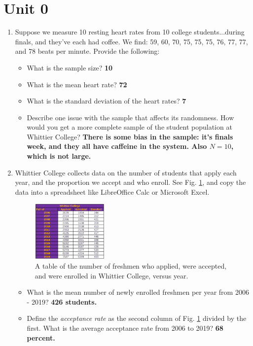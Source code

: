 \documentclass{article}
\begin{document}
\clearpage

\section{Unit 0}

\begin{enumerate}
\item Suppose we measure 10 resting heart rates from 10 college students...during finals, and they've each had coffee.  We find: 59, 60, 70, 75, 75, 75, 76, 77, 77, and 78 beats per minute.  Provide the following:
\begin{itemize}
\item What is the sample size? \textbf{10}
\item What is the mean heart rate? \textbf{72}
\item What is the standard deviation of the heart rates? \textbf{7}
\item Describe one issue with the sample that affects its randomness.  How would you get a more complete sample of the student population at Whittier College? \textbf{There is some bias in the sample: it's finals week, and they all have caffeine in the system.  Also $N = 10$, which is not large.}
\end{itemize}
\vspace{1cm}
\item Whittier College collects data on the number of students that apply each year, and the proportion we accept and who enroll.  See Fig. \ref{fig:admit}, and copy the data into a spreadsheet like LibreOffice Calc or Microsoft Excel.
\begin{figure}[ht]
\centering
\includegraphics[width=0.35\textwidth]{figures/admit.png}
\caption{\label{fig:admit} A table of the number of freshmen who applied, were accepted, and were enrolled in Whittier College, versus year.}
\end{figure}
\begin{itemize}
\item What is the mean number of newly enrolled freshmen per year from 2006 - 2019? \textbf{426 students.}
\item Define the \textit{acceptance rate} as the second column of Fig. \ref{fig:admit} divided by the first.  What is the average acceptance rate from 2006 to 2019? \textbf{68 percent.}

\end{itemize}
\end{enumerate}
\end{document}
